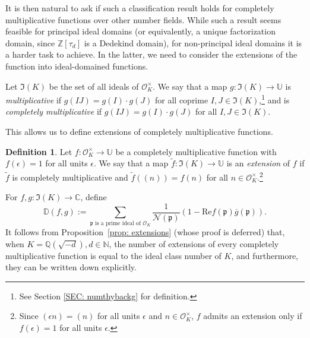 \documentclass[11pt]{amsart}
\theoremstyle{definition}
\newtheorem{definition}[lemma]{Definition}
\newcommand{\C}{{\mathbb C}}
\newcommand{\D}{{\mathbb D}}
\newcommand{\N}{{\mathbb N}}
\newcommand{\NN}{{\mathcal N}}
\newcommand{\Q}{{\mathbb Q}}
\newcommand{\Z}{{\mathbb Z}}
\newcommand{\U}{{\mathbb U}}
\newcommand{\e}{\epsilon}
\begin{document}
\fi

It is then natural to ask if such a classification result holds for completely multiplicative functions over other number fields. While such a result seems feasible for principal ideal domains (or equivalently, a unique factorization domain, since $\Z[\tau_d]$ is a Dedekind domain), for non-principal ideal domains it is a harder task to achieve. In the latter, we need to consider the extensions of the function into ideal-domained functions.
%


 
Let $\mathfrak{I}(K)$ be the set of all ideals of $\mathcal{O}_K^{\times}$. We say that a map $g\colon \mathfrak{I}(K)\to \U$ is \emph{multiplicative} if $g(IJ)=g(I)\cdot g(J)$ for all coprime  $I,J\in\mathfrak{I}(K)$,\footnote{See Section \ref{SEC: numthybackg} for definition.} and is  \emph{completely multiplicative} if $g(IJ)=g(I)\cdot g(J)$ for all  $I,J\in\mathfrak{I}(K)$.

This allows us to define extensions of completely multiplicative functions.
\begin{definition}\label{def: multfunction extension}
Let $f\colon \mathcal{O}_K^{\times}\to\U$ be a completely multiplicative function with $f(\e)=1$ for all units $\e$. We say that a map $\tilde{f}\colon \mathfrak{I}(K)\to \U$ is an \emph{extension} of $f$ if $\tilde{f}$ is completely multiplicative and $\tilde{f}((n))=f(n)$ for all $n\in \mathcal{O}_K^{\times}.$\footnote{Since $(\e n)=(n)$ for all units $\e$ and $n\in\mathcal{O}_K^{\times}$, $f$ admits an extension only if $f(\e)=1$ for all units $\e$.} 
\end{definition}
For  $f,g\colon\mathfrak{I}(K)\to\C$, define
\begin{equation}\label{ddf}
    \D(f,g):=\sum_{\mathfrak{p} \text{ is a prime ideal of } \mathcal{O}_{K}}\frac{1}{\NN(\mathfrak{p})}(1-\text{Re}f(\mathfrak{p})\overline{g}(\mathfrak{p})).
\end{equation}
It follows from Proposition~\ref{prop: extensions} (whose proof is deferred) that, when $K=\Q(\sqrt{-d}), d\in\N$, the number of extensions of every completely multiplicative function is equal to the ideal class number of $K$, and furthermore, they can be written down explicitly.
\end{document}
